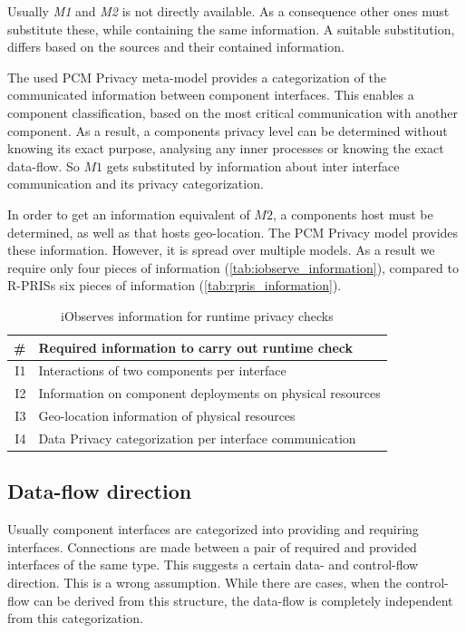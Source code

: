 Usually \textit{M1} and \textit{M2} is not directly available. As a consequence other ones must substitute these, while containing the same information. A suitable substitution, differs based on the sources and their contained information.

The used PCM Privacy meta-model provides a categorization of the communicated information between component interfaces. This enables a component classification, based on the most critical communication with another component. As a result, a components privacy level can be determined without knowing its exact purpose, analysing any inner processes or knowing the exact data-flow. So $M1$ gets substituted by information about inter interface communication and its privacy categorization.

In order to get an information equivalent of $M2$, a components host must be determined, as well as that hosts geo-location. The PCM Privacy model provides these information. However, it is spread over multiple models. As a result we require only four pieces of information (\autoref{tab:iobserve_information}), compared to R-PRISs six pieces of information (\autoref{tab:rpris_information}).

\begin{table}[h]
	\centering
	\begin{tabular}{r | l}
		\hline
		\textbf{\#} & \textbf{Required information to carry out runtime check}\\
		\hline
		I1 & Interactions of two components per interface \\
		I2 & Information on component deployments on physical resources \\
		I3 & Geo-location information of physical resources \\
		I4 & Data Privacy categorization per interface communication \\
		\hline
	\end{tabular}
	\caption{iObserves information for runtime privacy checks}
	\label{tab:iobserve_information}
\end{table}

\subsection{Data-flow direction}
\label{sec:PrivacyAnalysis:theory:dataflow}
Usually component interfaces are categorized into providing and requiring interfaces. Connections are made between a pair of required and provided interfaces of the same type. This suggests a certain data- and control-flow direction. This is a wrong assumption. While there are cases, when the control-flow can be derived from this structure, the data-flow is completely independent from this categorization.

